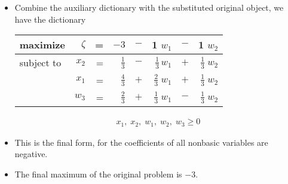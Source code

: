 \documentclass[usenames,dvipsnames,8pt]{beamer}%
\begin{document}
\begin{frame}
\begin{columns}
\begin{column}{0.5\textwidth}
      \begin{itemize}
        \item Combine the auxiliary dictionary with the substituted original object, we have the dictionary  
          \vspace{0.1cm}
          \begin{table}[ht]
            \centering
            \setlength\tabcolsep{2pt}
            \begin{tabular}{lrrrcrcr}
              \toprule
              maximize   &$\zeta$& = & $-3$ & $-$ & 1 $w_1$ & $-$ & 1 $w_2$ \\
              \midrule
              subject to & $x_2$ & = & $\frac{1}{3}$ & $-$ & $\frac{1}{3}\,w_1$ & $+$ & $\frac{1}{3}\;w_2$ \\
                         & $x_1$ & = & $\frac{4}{3}$ & $+$ & $\frac{2}{3}\;w_1$ & $+$ & $\frac{1}{3}\;w_2$\\
                         & $w_3$ & = & $\frac{2}{3}$ & $+$ & $\frac{1}{3}\;w_1$ & $-$ &$\frac{1}{3}\;w_2$ \\ 
              \bottomrule
            \end{tabular}
          \end{table}
          \vspace{-0.4cm}
          \begin{align*}
            x_1,\;x_2,\;w_1,\;w_2,\;w_3\geqslant 0
          \end{align*}
        \item This is the final form, for the coefficients of all nonbasic variables are negative.
        \item The final maximum of the original problem is $-3$.
      \end{itemize}
    \end{column}
  \end{columns}
\end{frame}
\end{document}
